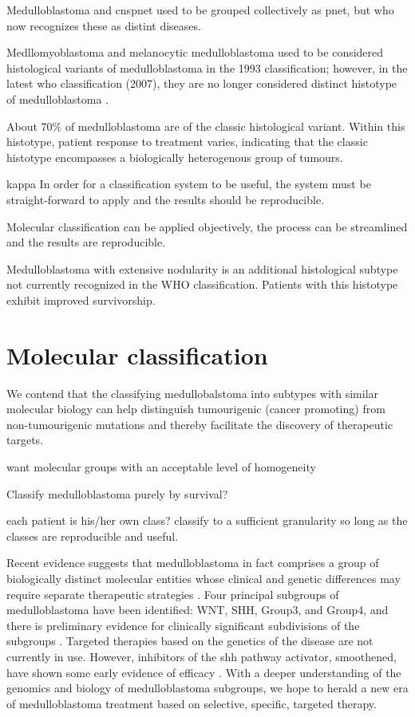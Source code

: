 Medulloblastoma and \gls{cnspnet} used to be grouped collectively as \gls{pnet}, but \gls{who} now recognizes these as distint diseases.

Medllomyoblastoma and melanocytic medulloblastoma used to be considered histological variants of medulloblastoma in the 1993 classification; however, in the latest \gls{who} classification (2007), they are no longer considered distinct histotype of medulloblastoma .

About 70\% of medulloblastoma are of the classic histological variant. Within this histotype, patient response to treatment varies, indicating that the classic histotype encompasses a biologically heterogenous group of tumours.

kappa
In order for a classification system to be useful, the system must be straight-forward to apply and the results should be reproducible.

Molecular classification can be applied objectively, the process can be streamlined and the results are reproducible.

Medulloblastoma with extensive nodularity is an additional histological subtype not currently recognized in the WHO classification. Patients with this histotype exhibit improved survivorship.

\section{Molecular classification}

We contend that the classifying medullobalstoma into subtypes with similar molecular biology can help distinguish tumourigenic (cancer promoting) from non-tumourigenic mutations and thereby facilitate the discovery of therapeutic targets. 

want molecular groups with an acceptable level of homogeneity

Classify medulloblastoma purely by survival?

each patient is his/her own class?
classify to a sufficient granularity so long as the classes are reproducible and useful.

Recent evidence suggests that medulloblastoma in fact comprises a group of biologically distinct molecular entities whose clinical and genetic differences may require separate therapeutic strategies . Four principal subgroups of medulloblastoma have been identified: WNT, SHH, Group3, and Group4, and there is preliminary evidence for clinically significant subdivisions of the subgroups . Targeted therapies based on the genetics of the disease are not currently in use. However, inhibitors of the \gls{shh} pathway activator, smoothened, have shown some early evidence of efficacy . With a deeper understanding of the genomics and biology of medulloblastoma subgroups, we hope to herald a new era of medulloblastoma treatment based on selective, specific, targeted therapy.

